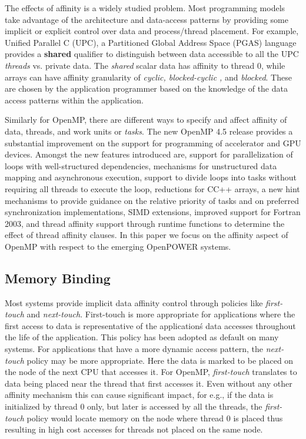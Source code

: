 The effects of affinity is a widely studied problem. Most programming models 
take advantage of the architecture and data-access patterns by providing some 
implicit or explicit control over data and process/thread placement. For example,
Unified Parallel C (UPC), a Partitioned Global Address Space (PGAS) language 
provides a \textbf{shared} qualifier to distinguish between data 
accessible to all the UPC \textit{threads} vs. private data. The \textit{shared} scalar data has 
affinity to thread 0, while arrays can have affinity granularity of \textit{cyclic, blocked-cyclic ,}
and \textit{blocked}. These are chosen by the application programmer based on the 
knowledge of the data access patterns within the application. 

Similarly for OpenMP, there are 
different ways to specify and affect affinity of data, threads, and work units or \textit{tasks}. 
The new OpenMP 4.5 release provides a substantial 
improvement on the support for programming of accelerator and GPU devices. 
Amongst the new features introduced are, support for parallelization of loops with 
well-structured dependencies, mechanisms for unstructured data mapping and 
asynchronous execution, support to divide loops into tasks without requiring all 
threads to execute the loop, reductions for C\/C++ arrays, a new hint mechanisms to 
provide guidance on the relative priority of tasks and on preferred synchronization 
implementations, SIMD extensions, improved support for Fortran 2003, and
thread affinity support through runtime functions to determine the effect of thread 
affinity clauses. In this paper we focus on the affinity aspect of OpenMP with respect 
to the emerging OpenPOWER systems.

\subsection{Memory Binding}
Most systems provide implicit data affinity control through policies like \textit{first-touch} 
and \textit{next-touch}. First-touch is more appropriate for applications where the 
first access to data is representative of the application\'s data accesses throughout 
the life of the application. This policy has been adopted as default on many systems. 
For applications that have a more dynamic access pattern, the \textit{next-touch} 
policy may be more appropriate. Here the data is marked to be placed on the node of the 
next CPU that accesses it. For OpenMP, \textit{first-touch} translates to data being 
placed near the thread that first accesses it. Even without any other affinity mechanism this 
can cause significant impact, for e.g., if the data is initialized by thread 0 only, but later is accessed 
by all the threads, the \textit{first-touch} policy would locate memory on the node where 
thread 0 is placed thus resulting in high cost accesses for threads not placed on the same node. 

